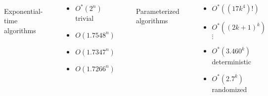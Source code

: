 \begin{frame}
	\pause
	\noindent
	\begin{columns}
		\begin{minipage}[t]{.49\textwidth}
			{\color{Blue}\rule{\linewidth}{4pt}\\
				\centering Exponential-time algorithms\newline
				\rule{\linewidth}{4pt}}
			\slides{\vspace{-4mm}}
			\begin{itemize}
				\item $O^*(2^n)$ trivial
				\item $O(1.7548^n)$ \cite{FominGPR08}
				\item $O(1.7347^n)$ \cite{FominV10}
				\item $O(1.7266^n)$ \cite{XiaoN15}
			\end{itemize}
		\end{minipage}%
		\hfill%
		\begin{minipage}[t]{.49\textwidth}
			{\color{Green}\rule{\linewidth}{4pt}\\
				\centering Parameterized algorithms\newline
				\rule{\linewidth}{4pt}}
			\slides{\vspace{-4mm}}
			\begin{itemize}
				\item $O^*((17k^4)!)$ \cite{Bodlaender94}
				\item $O^*((2k+1)^k)$ \cite{DowneyF99}
				\\{\footnotesize $\vdots$}
				\item $O^*(3.460^k)$ deterministic \cite{IwataK19}
				\item $O^*(2.7^k)$ randomized \cite{LiN19}
			\end{itemize}
		\end{minipage}%
	\end{columns}
\end{frame}

